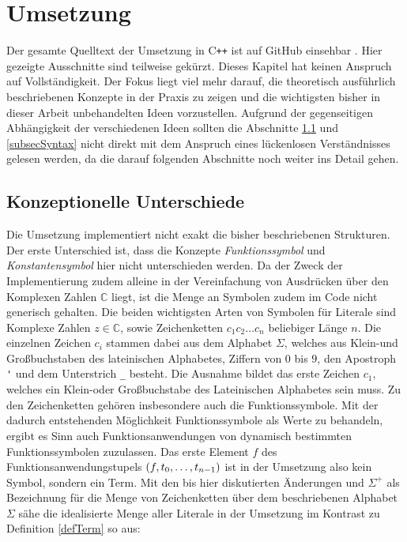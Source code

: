 

\chapter{Umsetzung} \label{secKernUmsetzungInCpp}

Der gesamte Quelltext der Umsetzung in C\texttt{++} ist auf GitHub einsehbar \cite{brunizzl2021Jul}. Hier gezeigte Ausschnitte sind teilweise gekürzt.
Dieses Kapitel hat keinen Anspruch auf Vollständigkeit. Der Fokus liegt viel mehr darauf, die theoretisch ausführlich beschriebenen Konzepte in der Praxis zu zeigen und die wichtigsten bisher in dieser Arbeit unbehandelten Ideen vorzustellen. Aufgrund der gegenseitigen Abhängigkeit der verschiedenen Ideen sollten die Abschnitte \ref{subsecKonzeptionelleUnterschiede} und \ref{subsecSyntax} nicht direkt mit dem Anspruch eines lückenlosen Verständnisses gelesen werden, da die darauf folgenden Abschnitte noch weiter ins Detail gehen.

\section{Konzeptionelle Unterschiede} \label{subsecKonzeptionelleUnterschiede}
Die Umsetzung implementiert nicht exakt die bisher beschriebenen Strukturen. Der erste Unterschied ist, dass die Konzepte \emph{Funktionssymbol} und \emph{Konstantensymbol} hier nicht unterschieden werden. Da der Zweck der Implementierung zudem alleine in der Vereinfachung von Ausdrücken über den Komplexen Zahlen $\mathbb C$ liegt, ist die Menge an Symbolen zudem im Code nicht generisch gehalten. Die beiden wichtigsten Arten von Symbolen für Literale sind Komplexe Zahlen $z \in \mathbb C$, sowie Zeichenketten $c_1 c_2\dots c_n$ beliebiger Länge $n$. Die einzelnen Zeichen $c_i$ stammen dabei aus dem Alphabet $\Sigma$, welches aus Klein-und Großbuchstaben des lateinischen Alphabetes, Ziffern von $0$ bis $9$, den Apostroph \verb|'| und dem Unterstrich \verb|_| besteht. Die Ausnahme bildet das erste Zeichen $c_1$, welches ein Klein-oder Großbuchstabe des Lateinischen Alphabetes sein muss. Zu den Zeichenketten gehören insbesondere auch die Funktionssymbole. Mit der dadurch entstehenden Möglichkeit Funktionssymbole als Werte zu behandeln, ergibt es Sinn auch Funktionsanwendungen von dynamisch bestimmten Funktionssymbolen zuzulassen. Das erste Element $f$ des Funktionsanwendungstupels $(f, {t}_{0}, \dots, {t}_{n-1})$ ist in der Umsetzung also kein Symbol, sondern ein Term. Mit den bis hier diskutierten Änderungen und $\Sigma^+$ als Bezeichnung für die Menge von Zeichenketten über dem beschriebenen Alphabet $\Sigma$ sähe die idealisierte Menge aller Literale in der Umsetzung im Kontrast zu Definition \ref{defTerm} so aus:

